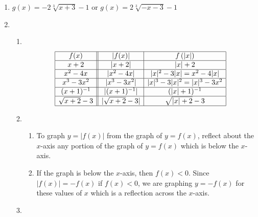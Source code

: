 \documentclass{ximera}
\begin{document}
\begin{enumerate}
\setcounter{enumi}{\value{HW}}



\item $g(x) = -2\sqrt[3]{x + 3} - 1$ or $g(x) = 2\sqrt[3]{-x - 3} - 1$

\addtocounter{enumi}{4}

\item  \begin{enumerate}

\item  $~$


 
\[ \begin{array}{|c||c|c|}

\hline

f(x) & |f(x)| & f\left(|x| \right)  \\ \hline

x+2 &     |x+2|   &       |x|+2      \\ \hline

x^2-4x &    |x^2-4x|      &     |x|^2-3|x| = x^2-4|x|      \\  \hline

x^3-3x^2 &    |x^3-3x^2|     &  |x|^3-3|x|^2 = |x|^3-3x^2      \\  \hline  

(x+1)^{-1}  &     |(x+1)^{-1}|      &    (|x|+1)^{-1}       \\  \hline   

\sqrt{x+2}-3&    | \sqrt{x+2}-3 |       &    \sqrt{|x|+2}-3    \\  \hline   

 \end{array} \]



\item  \begin{enumerate}

\item To graph $y=|f(x)|$ from the graph of  $y=f(x)$, reflect about the $x$-axis any portion of the graph of $y=f(x)$ which is below the $x$-axis.

\item  If the graph is below the $x$-axis, then $f(x) < 0$.  Since $|f(x)| = -f(x)$ if $f(x) < 0$, we are graphing $y=-f(x)$ for these values of $x$ which is a reflection across the $x$-axis.

\end{enumerate}

\item   \begin{enumerate}


\end{enumerate}
\end{enumerate}
\end{enumerate}
\end{document}
